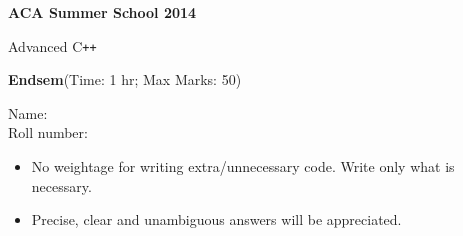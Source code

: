 \documentclass[12pt]{article}
\date{ }
\begin{document}
\begin{center}
\textbf{\LARGE{ACA Summer School 2014}}\vspace{.5cm}

\large{Advanced C\texttt{++}} \\ \vspace{.5cm}

\textbf{\large{Endsem}}(Time: 1 hr; Max Marks: 50)
\end{center}
Name: \\
Roll number: 
\begin{itemize}
\item No weightage for writing extra/unnecessary code. Write only what is necessary.
\item Precise, clear and unambiguous answers will be appreciated.
\end{itemize}
\end{document}
